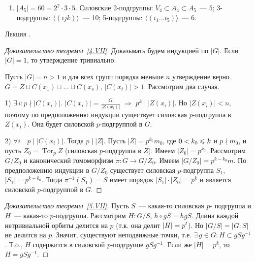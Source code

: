 \documentclass[a4paper]{article}
\newcounter{lec}
\renewcommand{\thelec}{\Roman{lec}}
\newcommand*{\lecture}[1]{\refstepcounter{lec}\vspace{20pt}
\begin{center}{\rmfamily\textsc{Лекция \thelec. \\ \textbf{#1}}}\vspace{5pt}
\end{center}}
\renewcommand{\Tor}{\mathop{\mathrm{Tor}}\nolimits}
\newcommand*{\p}[1]{#1\nobreak\discretionary{}{\hbox{$\mathsurround=0pt #1$}}{}}
\begin{document}
\begin{ex}
\begin{enumerate}
  \item $|A_5|=60=2^2\cdot3\cdot5$. Силовские 2-подгруппы: $V_4\subset A_4\subset
  A_5$~--- 5; 3-подгруппы: $\langle(ijk)\rangle$~--- 10;
  5-подгруппы: $\langle(i_1\ldots i_5)\rangle$~--- 6.
\end{enumerate}
\end{ex}
\lecture{}

\begin{proof}[Доказательство теоремы~\ref{4.VII}]
Доказывать будем индукцией по $|G|$. Если $|G|=1$, то утверждение
тривиально.

Пусть $|G|=n>1$ и для всех групп порядка меньше $n$ утверждение
верно. $G=Z\sqcup C(x_1)\sqcup\ldots\sqcup C(x_s)$, $|C(x_i)|>1$.
Рассмотрим два случая.

1) $\exists \, i: p\nmid |C(x_i)|$. $|C(x_i)|=\frac{|G|}{|Z(x_i)|}$
$\Rightarrow$ $p^k\mid |Z(x_i)|$. Но $|Z(x_i)|<n$, поэтому по
предположению индукции существует силовская $p$-подгруппа в
$Z(x_i)$. Она будет силовской $p$-подгруппой в $G$.

2) $\forall i\quad p\mid |C(x_i)|$. Тогда $p\mid |Z|$. Пусть
$|Z|=p^{k_0}m_0$, где $0<k_0\p\leqslant k$ и $p\nmid m_0$, и пусть
$Z_0=\Tor_pZ$ (силовская $p$-подгруппа в $Z$). Имеем
$|Z_0|=p^{k_0}$. Рассмотрим $G/Z_0$ и канонический гомоморфизм
$\pi\colon G\to G/Z_0$. Имеем $|G/Z_0|=p^{k-k_0}m$. По предположению
индукции в $G/Z_0$ существует силовская $p$-подгруппа $S_1$,
$|S_1|=p^{k-k_0}$. Тогда $\pi^{-1}(S_1)=S$ имеет порядок $|S_1|\cdot
|Z_0|=p^k$ и является силовской $p$-подгруппой в $G$.
\end{proof}

\begin{proof}[Доказательство теоремы~\ref{5.VII}]
Пусть $S$~--- какая-то силовская $p$- подгруппа и $H$~--- какая-то
$p$-подгруппа. Рассмотрим $H:G/S$, $h\circ gS=hgS$. Длина каждой
нетривиальной орбиты делится на $p$ (т.к. она делит $|H|\p=p^l$). Но
$|G/S|=|G:S|$ не делится на $p$. Значит, существуют неподвижные
точки, т.е. $\exists \, g\in G: H\subset gSg^{-1}$. Т.о., $H$
содержится в силовской $p$-подгруппе $gSg^{-1}$. Если же $|H|=p^k$,
то $H=gSg^{-1}$.
\end{proof}
\end{document}
